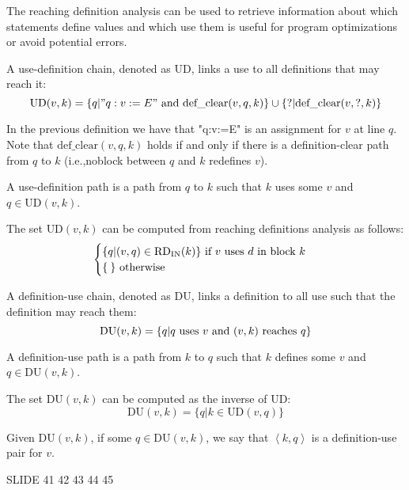 The reaching definition analysis can be used to retrieve information about which statements define values and which use them is useful for program optimizations or avoid potential errors. 
\begin{definition}
    A use-definition chain, denoted as UD, links a use to all definitions that may reach it: 
    \[\text{UD}(v,k)=\{q|{"q:v:=E"} \textnormal{ and def\_clear}(v,q,k)\}\cup\{?|\text{def\_clear}(v,?,k)\}\]
\end{definition}
In the previous definition we have that "q:v:=E" is an assignment for $v$ at line $q$. 
Note that $\text{def\_clear}(v,q,k)$ holds if and only if there is a definition-clear path from $q$ to $k$ (i.e.,noblock between $q$ and $k$ redefines $v$). 
\begin{definition}
    A use-definition path is a path from $q$ to $k$ such that $k$ uses some $v$ and $q \in \text{UD}(v,k)$.
\end{definition}
The set $\text{UD}(v, k)$ can be computed from reaching definitions analysis as follows: 
\[\begin{cases}
    \{q|(v,q)\in \text{RD}_{\text{IN}}(k)\} \textnormal{ if }v \textnormal{ uses } d \textnormal{ in block } k \\
    \{\:\} \textnormal{ otherwise}
\end{cases}\]
\begin{definition}
    A definition-use chain, denoted as DU, links a definition to all use such that the definition may reach them:
    \[\text{DU}(v,k)=\{q|q \textnormal{ uses } v \textnormal{ and } (v,k) \textnormal{ reaches } q\}\]
\end{definition}
\begin{definition}
    A definition-use path is a path from $k$ to $q$ such that $k$ defines some $v$ and $q \in \text{DU}(v,k)$.
\end{definition}
The set $\text{DU}(v, k)$ can be computed as the inverse of UD: 
\[ \text{DU}(v,k)=\{q|k \in \text{UD}(v,q)\}\]
\begin{definition}
    Given $\text{DU}(v,k)$, if some $q \in \text{DU}(v, k)$, we say that $\left\langle k,q \right\rangle $ is a definition-use pair for $v$.
\end{definition}
\begin{example}
    SLIDE 41 42 43 44 45
\end{example}

